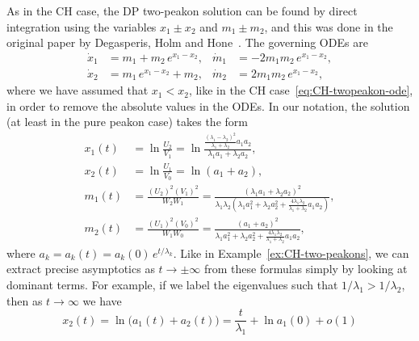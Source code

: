 \documentclass[10pt,a4paper]{article} \pdfoutput=1 
\begin{document}
\begin{example}
  \label{ex:DP-two-peakons}
  As in the CH case, the DP two-peakon solution can be found by
  direct integration using the variables $x_1 \pm x_2$ and $m_1 \pm m_2$,
  and this was done in the original paper by Degasperis, Holm and
  Hone~\cite{degasperis-holm-hone:2002:new-integrable-equation-DP}.
  The governing ODEs are
  \begin{equation}
    \label{eq:DP-twopeakon-ode}
    \begin{aligned}
      \dot x_1 &= m_1 + m_2 \, e^{x_1-x_2}
      , &
      \dot m_1 &= - 2 m_1 m_2 \, e^{x_1-x_2}
      , \\
      \dot x_2 &= m_1 \, e^{x_1-x_2} + m_2
      , &
      \dot m_2 &= 2 m_1 m_2 \, e^{x_1-x_2}
      ,
    \end{aligned}
  \end{equation}
  where we have assumed that $x_1 < x_2$,
  like in the CH case~\eqref{eq:CH-twopeakon-ode},
  in order to remove the absolute values in the ODEs.
  In our notation, the solution (at least in the pure peakon case) takes the form
  \begin{equation}
    \label{eq:DP-twopeakon-solution}
    \begin{split}
      x_1(t) &= \ln\frac{U_2}{V_1}
      = \ln \frac{\frac{(\lambda_1-\lambda_2)^2}{\lambda_1+\lambda_2}a_1 a_2}{\lambda_1 a_1 + \lambda_2 a_2}
      , \\
      x_2(t) &= \ln\frac{U_1}{V_0} = \ln (a_1+a_2)
      , \\
      m_1(t) &= \frac{(U_2)^2 (V_1)^2}{W_2 W_1} = \frac{(\lambda_1 a_1 + \lambda_2 a_2)^2}{\lambda_1 \lambda_2 \left( \lambda_1 a_1^2 + \lambda_2 a_2^2 + \frac{4 \lambda_1 \lambda_2}{\lambda_1+\lambda_2}a_1 a_2 \right)}
      , \\
      m_2(t) &= \frac{(U_1)^2 (V_0)^2}{W_1 W_0} = \frac{(a_1+a_2)^2}{\lambda_1 a_1^2 + \lambda_2 a_2^2 + \frac{4 \lambda_1 \lambda_2}{\lambda_1+\lambda_2}a_1 a_2}
      ,
    \end{split}
  \end{equation}
  where $a_k = a_k(t) = a_k(0) \, e^{t/\lambda_k}$.
  Like in Example~\ref{ex:CH-two-peakons}, we can extract precise asymptotics as $t \to \pm\infty$
  from these formulas simply by looking at dominant terms. For example,
  if we label the eigenvalues such that $1/\lambda_1 > 1/\lambda_2$,
  then as $t \to \infty$ we have
  \begin{equation}
    x_2(t) = \ln\big( a_1(t) + a_2(t) \bigr)
    = \frac{t}{\lambda_1} + \ln a_1(0) + o(1)

\end{equation}
\end{example}
\end{document}
